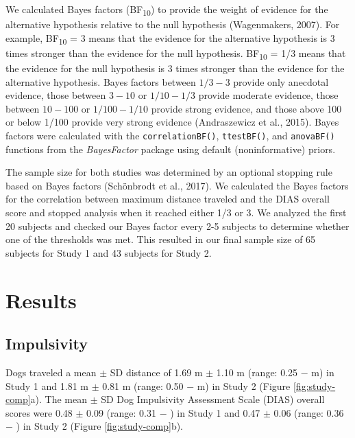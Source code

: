 \documentclass[
  pub,floatsintext]{apa6}
\begin{document}
We calculated Bayes factors (BF\textsubscript{10}) to provide the weight of evidence for the alternative hypothesis relative to the null hypothesis (Wagenmakers, 2007). For example, BF\textsubscript{10} = 3 means that the evidence for the alternative hypothesis is 3 times stronger than the evidence for the null hypothesis. BF\textsubscript{10} = 1/3 means that the evidence for the null hypothesis is 3 times stronger than the evidence for the alternative hypothesis. Bayes factors between \(1/3-3\) provide only anecdotal evidence, those between \(3-10\) or \(1/10-1/3\) provide moderate evidence, those between \(10-100\) or \(1/100-1/10\) provide strong evidence, and those above 100 or below 1/100 provide very strong evidence (Andraszewicz et al., 2015). Bayes factors were calculated with the \texttt{correlationBF()}, \texttt{ttestBF()}, and \texttt{anovaBF()} functions from the \emph{BayesFactor} package using default (noninformative) priors.

The sample size for both studies was determined by an optional stopping rule based on Bayes factors (Schönbrodt et al., 2017). We calculated the Bayes factors for the correlation between maximum distance traveled and the DIAS overall score and stopped analysis when it reached either 1/3 or 3. We analyzed the first 20 subjects and checked our Bayes factor every 2-5 subjects to determine whether one of the thresholds was met. This resulted in our final sample size of 65 subjects for Study 1 and 43 subjects for Study 2.

\hypertarget{results}{%
\section{Results}\label{results}}

\hypertarget{impulsivity}{%
\subsection{Impulsivity}\label{impulsivity}}

Dogs traveled a mean \(\pm\) SD distance of 1.69 m \(\pm\) 1.10 m (range: 0.25 \negthickspace \(-\)  m) in Study 1 and 1.81 m \(\pm\) 0.81 m (range: 0.50 \negthickspace \(-\)  m) in Study 2 (Figure \ref{fig:study-comp}a). The mean \(\pm\) SD Dog Impulsivity Assessment Scale (DIAS) overall scores were 0.48 \(\pm\) 0.09 (range: 0.31 \negthickspace \(-\) ) in Study 1 and 0.47 \(\pm\) 0.06 (range: 0.36 \negthickspace \(-\) ) in Study 2 (Figure \ref{fig:study-comp}b).
\end{document}
